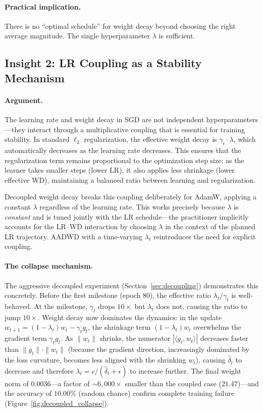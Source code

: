 \documentclass{article}
\begin{document}
\paragraph{Practical implication.}
There is no ``optimal schedule'' for weight decay beyond choosing the right average
magnitude.
The single hyperparameter $\lambda$ is sufficient.

\subsection{Insight 2: LR Coupling as a Stability Mechanism}

\paragraph{Argument.}
The learning rate and weight decay in SGD are not independent hyperparameters---they
interact through a multiplicative coupling that is essential for training stability.
In standard $\ell_2$ regularization, the effective weight decay is
$\gamma_t \cdot \lambda$, which automatically decreases as the learning rate
decreases.
This ensures that the regularization term remains proportional to the optimization
step size: as the learner takes smaller steps (lower LR), it also applies less
shrinkage (lower effective WD), maintaining a balanced ratio between learning and
regularization.

Decoupled weight decay \citep{loshchilov2019decoupled} breaks this coupling
deliberately for AdamW, applying a constant $\lambda$ regardless of the learning
rate.
This works precisely because $\lambda$ is \emph{constant} and is tuned jointly with
the LR schedule---the practitioner implicitly accounts for the LR--WD interaction by
choosing $\lambda$ in the context of the planned LR trajectory.
AADWD with a time-varying $\lambda_t$ reintroduces the need for explicit coupling.

\paragraph{The collapse mechanism.}
The aggressive decoupled experiment (Section~\ref{sec:decoupling}) demonstrates this
concretely.
Before the first milestone (epoch 80), the effective ratio $\lambda_t / \gamma_t$ is
well-behaved.
At the milestone, $\gamma_t$ drops $10\times$ but $\lambda_t$ does not, causing the
ratio to jump $10\times$.
Weight decay now dominates the dynamics: in the update
$w_{t+1} = (1 - \lambda_t) w_t - \gamma_t g_t$, the shrinkage term
$(1 - \lambda_t) w_t$ overwhelms the gradient term $\gamma_t g_t$.
As $\|w_t\|$ shrinks, the numerator $|\langle g_t, w_t \rangle|$ decreases faster
than $\|g_t\| \cdot \|w_t\|$ (because the gradient direction, increasingly dominated
by the loss curvature, becomes less aligned with the shrinking $w_t$), causing
$\hat{\delta}_t$ to decrease and therefore
$\lambda_t = c / (\hat{\delta}_t + \epsilon)$ to increase further.
The final weight norm of $0.0036$---a factor of $\sim 6{,}000\times$ smaller than
the coupled case ($21.47$)---and the accuracy of $10.00\%$ (random chance) confirm
complete training failure (Figure~\ref{fig:decoupled_collapse}).
\end{document}
